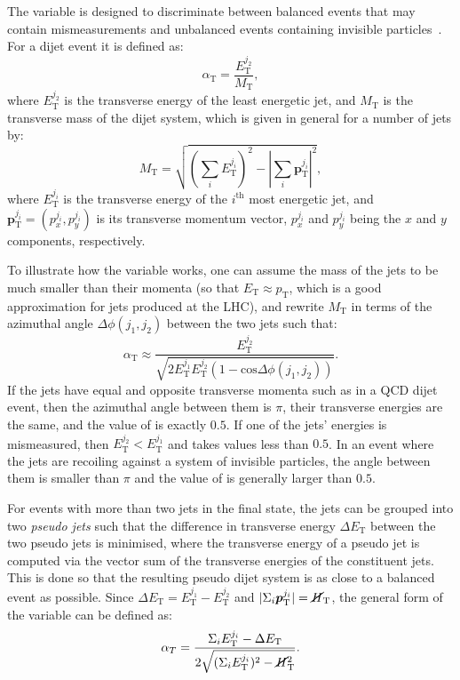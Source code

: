 The \alphat variable is designed to discriminate between balanced events that 
may contain mismeasurements and unbalanced events containing invisible 
particles~\cite{alpha-variable}. For a dijet event it is defined as:
\begin{equation}
\alpha_\mathrm T = \frac{E_\mathrm{T}^{j_2}}{M_\mathrm{T}}, 
\end{equation} 
where $E_\mathrm{T}^{j_2}$ is the transverse energy of the least energetic jet, 
and $M_\mathrm{T}$ is the transverse mass of the dijet system, which is given 
in general for a number of jets by:
\begin{equation}
M_\mathrm{T} = \sqrt{\left(\sum_{i}E_{\mathrm T}^{j_i}\right)^2 - 
\left|\sum_{i}\bm{p}_\mathrm{T}^{j_i}\right|^2},
\end{equation}
where $E_{\mathrm T}^{j_i}$ is the transverse energy of the $i^\mathrm{th}$ 
most energetic jet, and 
$\bm{p}_\mathrm{T}^{j_i} = (p_x^{j_i}, p_y^{j_i})$ is its 
transverse momentum vector, $p_x^{j_i}$ and $p_y^{j_i}$ being the $x$ and $y$ 
components, respectively. 

To illustrate how the \alphat variable works, one can assume the mass of the 
jets to be much smaller than their momenta (so that $E_\mathrm T \approx 
p_\mathrm T$, which is a good approximation for jets produced at the LHC), and 
rewrite $M_\mathrm T$ in terms of the 
azimuthal angle $\Delta\phi(j_1,j_2)$ between the two jets such that:
\begin{equation}
\alpha_\mathrm T \approx \frac{E_\mathrm{T}^{j_2}}{\sqrt{2E_{\mathrm 
T}^{j_1}E_{\mathrm T}^{j_2}(1-\mathrm{cos}\Delta\phi(j_1,j_2))}}.
\end{equation}
If the jets have equal and opposite transverse momenta such as in a QCD dijet 
event, then the azimuthal angle between them is $\pi$, their transverse 
energies are the same, and the value of \alphat is exactly $0.5$. If one of the 
jets' energies is mismeasured, then $E_\mathrm{T}^{j_2} < E_\mathrm{T}^{j_1}$ 
and \alphat takes values less than $0.5$. In an event where the jets are 
recoiling against a system of invisible particles, the angle between them is 
smaller than $\pi$ and the value of \alphat is generally larger than $0.5$.

For events with more than two jets in the final state, the jets can be grouped 
into two \textit{pseudo jets} such that the difference in transverse energy 
$\Delta E_\mathrm T$ between the two pseudo jets is minimised, where the 
transverse energy of a pseudo jet is computed via the vector sum of the 
transverse energies of the constituent jets. This is done so that the resulting 
pseudo dijet system is as close to a balanced event as possible. Since $\Delta 
E_\mathrm T = E_\mathrm{T}^{j_1} - E_\mathrm{T}^{j_2}$ and 
$|\Sigma_i\bm{p}_\mathrm{T}^{j_i}| = \mbox{$\cancel{H}_\text{T}$}$, the general form of the \alphat 
variable can be defined as:
\begin{equation}
\alpha_T=\frac{\Sigma_i E_\mathrm{T}^{j_i}-\Delta 
E_\mathrm{T}}{2\sqrt{(\Sigma_i E_\mathrm{T}^{j_i})^2-\cancel{H}_\mathrm{T}^2}}.
\end{equation}

